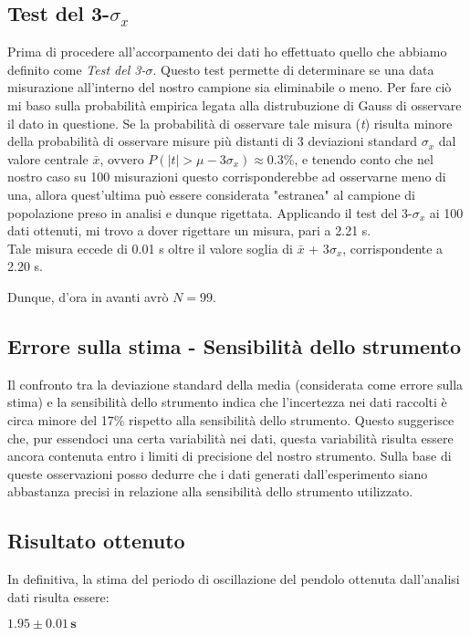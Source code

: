 \documentclass{article}
\begin{document}
\subsection{Test del 3-$\sigma_{x}$ }
Prima di procedere all'accorpamento dei dati ho effettuato quello che abbiamo definito come \textit{Test del 3-$\sigma$}. Questo test permette di determinare se una data misurazione all'interno del nostro campione sia eliminabile o meno. Per fare ciò mi baso sulla probabilità empirica legata alla distrubuzione di Gauss di osservare il dato in questione.
\newline\indent
Se la probabilità di osservare tale misura (\textit{t}) risulta minore della probabilità di osservare misure più distanti di 3 deviazioni standard $\sigma_x$ dal valore centrale $\bar{x}$, ovvero $P( |t| > \mu - 3\sigma_{x}) \approx 0.3\% $, e tenendo conto che nel nostro caso su 100 misurazioni questo corrisponderebbe ad osservarne meno di una, allora quest'ultima può essere considerata "estranea" al campione di popolazione preso in analisi e dunque rigettata.
\newline\newline 
Applicando il test del 3-$\sigma_x$ ai 100 dati ottenuti, mi trovo a dover rigettare un misura, pari a 2.21 s.
\\Tale misura eccede di 0.01 s oltre il valore soglia di $\bar{x}$ + 3$\sigma_x$, corrispondente a 2.20 s.

Dunque, d'ora in avanti avrò $N = 99$. 

\subsection{Errore sulla stima - Sensibilità dello strumento}
Il confronto tra la deviazione standard della media (considerata come errore sulla stima) e la sensibilità dello strumento indica che l'incertezza nei dati raccolti è circa minore del 17\% rispetto alla sensibilità dello strumento. Questo suggerisce che, pur essendoci una certa variabilità nei dati, questa variabilità risulta essere ancora contenuta entro i limiti di precisione del nostro strumento. Sulla base di queste osservazioni posso dedurre che i dati generati dall'esperimento siano abbastanza precisi in relazione alla sensibilità dello strumento utilizzato.

\subsection{Risultato ottenuto}
In definitiva, la stima del periodo di oscillazione del pendolo ottenuta dall'analisi dati risulta essere: 
\begin{center}
$\mathbf{1.95 \pm 0.01 \, \text{s}}$
\end{center}
\end{document}
